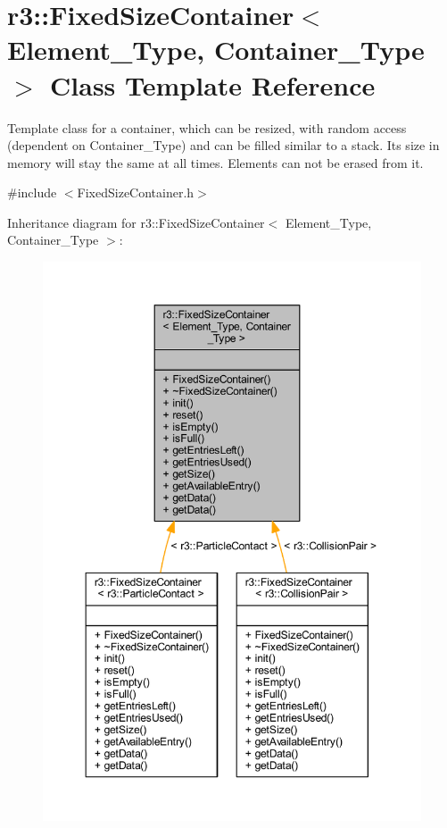 \hypertarget{classr3_1_1_fixed_size_container}{}\section{r3\+:\+:Fixed\+Size\+Container$<$ Element\+\_\+\+Type, Container\+\_\+\+Type $>$ Class Template Reference}
\label{classr3_1_1_fixed_size_container}


Template class for a container, which can be resized, with random access (dependent on Container\+\_\+\+Type) and can be filled similar to a stack. Its size in memory will stay the same at all times. Elements can not be erased from it.  




{\ttfamily \#include $<$Fixed\+Size\+Container.\+h$>$}



Inheritance diagram for r3\+:\+:Fixed\+Size\+Container$<$ Element\+\_\+\+Type, Container\+\_\+\+Type $>$\+:\nopagebreak
\begin{figure}[H]
\begin{center}
\leavevmode
\includegraphics[width=350pt]{classr3_1_1_fixed_size_container__inherit__graph}
\end{center}
\end{figure}


